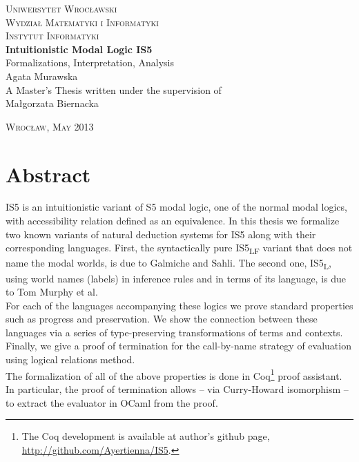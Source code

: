 \documentclass[a4paper,12pt]{report}
\newcommand{\logic}{IS5}
\newcommand{\clogic}{S5}
\newcommand{\logicL}{IS5\textsubscript{L}}
\newcommand{\logicLF}{IS5\textsubscript{LF}}
\theoremstyle{introtheoremBstyle}
\theoremstyle{plain}
\begin{document}
\newpage
\begin{center}
\textsc{\large Uniwersytet Wrocławski\\
Wydział Matematyki i Informatyki\\
Instytut Informatyki}\\
\vspace{4cm}
\Huge{\textbf{Intuitionistic Modal Logic \logic}}\\
\Large{\textmd{Formalizations, Interpretation, Analysis}}\\
\vspace{3cm}
\textmd{\Large Agata Murawska}\\
\vspace{3cm}
{\large A Master's Thesis written under the supervision of\\Małgorzata Biernacka }
\end{center}
\vfill
\begin{center}
\textsc{Wrocław, May 2013}
\end{center}

\newpage
\mbox{}

\newpage
\chapter*{Abstract}
\logic{} is an intuitionistic variant of \clogic{} modal logic,  one of the normal modal logics, with accessibility relation defined as an equivalence. In this thesis we formalize two known variants of natural deduction systems for \logic{} along with their corresponding languages. First, the syntactically pure \logicLF{} variant that does not name the modal worlds, is due to Galmiche and Sahli. The second one, \logicL{}, using world names (labels) in inference rules and in terms of its language, is due to Tom Murphy et al.\\

For each of the languages accompanying these logics we prove standard properties such as progress and preservation. We show the connection between these languages via a series of type-preserving transformations of terms and contexts. Finally, we give a proof of termination for the call-by-name strategy of evaluation using logical relations method.\\

The formalization of all of the above properties is done in Coq\footnote{The Coq development  is available at author's github page, \url{http://github.com/Ayertienna/IS5}.} proof assistant. In particular, the proof of termination allows -- via Curry-Howard isomorphism -- to extract the evaluator in OCaml from the proof.\\
\end{document}
